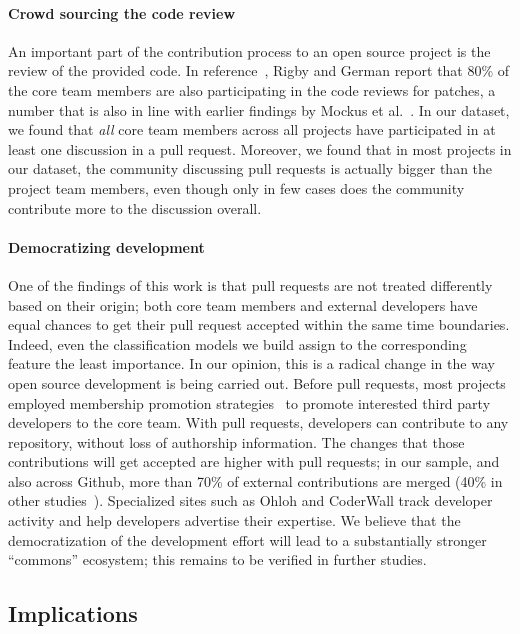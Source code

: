 \documentclass{sig-alternate}
\begin{document}
\paragraph{Crowd sourcing the code review}
An important part of the contribution process to an open source project is the
review of the provided code. In reference~\cite{Rigby06}, Rigby and German
report that 80\% of the core team members are also participating in the code
reviews for patches, a number that is also in line with earlier findings by
Mockus et al.~\cite{MOCKU02}. In our dataset, we found that \emph{all} core
team members across all projects have participated in at least
one discussion in a pull request. Moreover, we found that in most projects
in our dataset, the community discussing pull requests is actually bigger
than the project team members, even though only in few cases does the community
contribute more to the discussion overall.

\paragraph{Democratizing development} One of the findings of this work is that
pull requests are not treated differently based on their origin; both core team
members and external developers have equal chances to get their pull request
accepted within the same time boundaries. Indeed, even the classification
models we build assign to the corresponding feature the least importance.
In our opinion, this is a radical
change in the way open source development is being carried out. Before pull
requests, most projects employed membership promotion strategies~\cite{Jense07}
to promote interested third party developers to the core team. With pull
requests, developers can contribute to any repository, without loss of authorship
information. The changes that those contributions will get accepted are higher
with pull requests; in our sample, and also across Github, more than 70\% of external
contributions are merged (40\% in other studies~\cite{Rigby06, Weiss08}).
Specialized sites such as Ohloh and CoderWall track developer activity and help
developers advertise their expertise. We believe that the democratization of the
development effort will lead to a substantially stronger ``commons'' ecosystem;
this remains to be verified in further studies.

\subsection{Implications}
\end{document}
